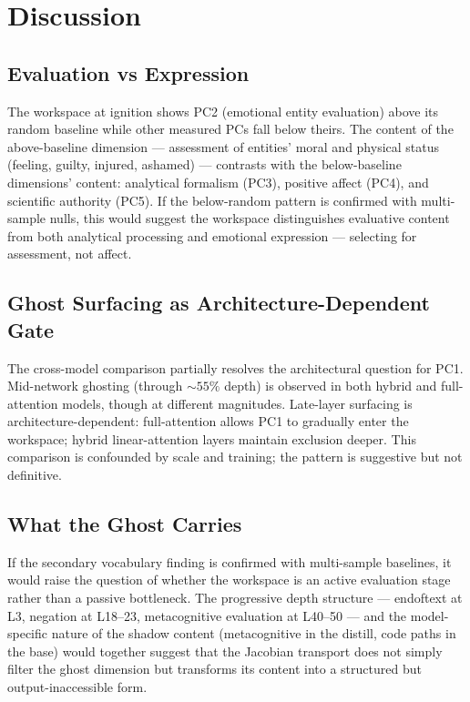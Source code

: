 \documentclass[11pt,a4paper]{article}
\begin{document}
\section{Discussion}

\subsection{Evaluation vs Expression}

The workspace at ignition shows PC2 (emotional entity evaluation) above its random baseline while other measured PCs fall below theirs. The content of the above-baseline dimension --- assessment of entities' moral and physical status (feeling, guilty, injured, ashamed) --- contrasts with the below-baseline dimensions' content: analytical formalism (PC3), positive affect (PC4), and scientific authority (PC5). If the below-random pattern is confirmed with multi-sample nulls, this would suggest the workspace distinguishes evaluative content from both analytical processing and emotional expression --- selecting for assessment, not affect.

\subsection{Ghost Surfacing as Architecture-Dependent Gate}

The cross-model comparison partially resolves the architectural question for PC1. Mid-network ghosting (through ${\sim}55\%$ depth) is observed in both hybrid and full-attention models, though at different magnitudes. Late-layer surfacing is architecture-dependent: full-attention allows PC1 to gradually enter the workspace; hybrid linear-attention layers maintain exclusion deeper. This comparison is confounded by scale and training; the pattern is suggestive but not definitive.

\subsection{What the Ghost Carries}

If the secondary vocabulary finding is confirmed with multi-sample baselines, it would raise the question of whether the workspace is an active evaluation stage rather than a passive bottleneck. The progressive depth structure --- endoftext at L3, negation at L18--23, metacognitive evaluation at L40--50 --- and the model-specific nature of the shadow content (metacognitive in the distill, code paths in the base) would together suggest that the Jacobian transport does not simply filter the ghost dimension but transforms its content into a structured but output-inaccessible form.
\end{document}
